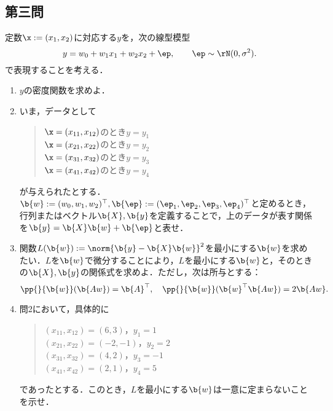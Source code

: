 \documentclass[uplatex,dvipdfmx]{jsarticle}
\begin{document}
\subsection{第三問}

\begin{tcolorbox}[colframe=ForestGreen, colback=ForestGreen!10!white,breakable,colbacktitle=ForestGreen!40!white,coltitle=black,fonttitle=\bfseries\sffamily,
    title=第３問]
    \begin{problem}\label{prob-15-1-3}
        定数$\x:=(x_1,x_2)$に対応する$y$を，次の線型模型
        \[y=w_0+w_1x_1+w_2x_2+\ep,\qquad \ep\sim\rN(0,\sigma^2).\]
        で表現することを考える．
        \begin{enumerate}[{問}1]
            \item $y$の密度関数を求めよ．
            \item いま，データとして
            \begin{quote}
                $\x=(x_{11},x_{12})$のとき$y=y_1$\\
                $\x=(x_{21},x_{22})$のとき$y=y_2$\\
                $\x=(x_{31},x_{32})$のとき$y=y_3$\\
                $\x=(x_{41},x_{42})$のとき$y=y_4$
            \end{quote}
            が与えられたとする．$\b{w}:=(w_0,w_1,w_2)^\top,\b{\ep}:=(\ep_1,\ep_2,\ep_3,\ep_4)^\top$と定めるとき，行列またはベクトル$\b{X},\b{y}$を定義することで，上のデータが表す関係を$\b{y}=\b{X}\b{w}+\b{\ep}$と表せ．
            \item 関数$L(\b{w}):=\norm{\b{y}-\b{X}\b{w}}^2$を最小にする$\b{w}$を求めたい．$L$を$\b{w}$で微分することにより，$L$を最小にする$\b{w}$と，そのときの$\b{X},\b{y}$の関係式を求めよ．ただし，次は所与とする：
            \[\pp{}{\b{w}}(\b{Aw})=\b{A}^\top,\quad\pp{}{\b{w}}(\b{w}^\top\b{Aw})=2\b{Aw}.\]
            \item 問2において，具体的に
            \begin{quote}
                $(x_{11},x_{12})=(6,3)$，$y_1=1$\\
                $(x_{21},x_{22})=(-2,-1)$，$y_2=2$\\
                $(x_{31},x_{32})=(4,2)$，$y_3=-1$\\
                $(x_{41},x_{42})=(2,1)$，$y_4=5$\\
            \end{quote}
            であったとする．このとき，$L$を最小にする$\b{w}$は一意に定まらないことを示せ．
        \end{enumerate}
    \end{problem}
\end{tcolorbox}
\end{document}

